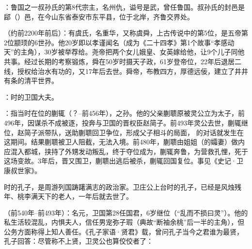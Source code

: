 ：鲁国之一叔孙氏的第8代宗主，名州仇，谥号是武，曾任鲁国。叔孙氏的封邑是郈（）邑，在今山东省泰安市东平县，位于北岸，齐鲁交界处。


（约前2200年前后）：有虞氏，名重华，又称虞舜，上古传说中的第5位，是五帝第2位颛顼的6世孙。他20岁即以孝谨闻名（成为《二十四孝》第1个故事“孝感动天”的主角），30岁被举荐给。尧帝把两个女儿娥皇、女英嫁给他，让9个儿子同他共事。经过长期的考察锻炼，舜在50岁时摄天子政，61岁登帝位，22年后退居二线，授权给治水有功的，又17年后去世。舜帝，布教四方，厚德远佞，建立了井井有条的清平世界。

：时的卫国大夫。

：指当时在位的蒯辄（？--前456年），之孙。他的父亲蒯聩原被灵公立为太子，前496年，因谋杀不成被逐，投奔与卫国的晋权臣赵简子。前493年灵公去世，蒯辄继位，赵简子派带队，送助蒯聩回卫争位，形成父子相斗的局面， 的对话就发生在这期间。结果蒯聩被卫人阻截，无法入境。前480年，蒯聩由姐姐（的孀妻）做内应混入都城，挟持了外甥发动叛乱，终于夺位成为，蒯辄奔鲁，为营救孔悝，死于这场变故。3年后，晋又围卫，蒯聩出逃后被杀，蒯辄回国复位。事见《史记·卫康叔世家》。%

时的孔子，是周游列国踌躇满志的政治家。卫庄公上台时的孔子，已经是风烛残年、桃李满天下的老人，一年后就去世了。

（前540年--前493年）：名元，卫国第28任国君，6岁继位（“乱而不损曰灵”）。他的私生活较混乱，内惧夫人，信任男宠弥子瑕（典故“断袖余桃”后一半的主角），但公务方面称得上知人善任。《孔子家语·贤君》载，曾问孔子当今之君谁为最贤，孔子回答：尽管称不上贤，卫灵公也算佼佼者了：

